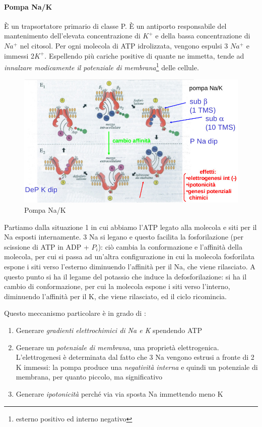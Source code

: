 \documentclass[a4paper,12pt]{article}
\begin{document}
\paragraph{Pompa Na/K}
È un trapsortatore primario di classe P. È un  antiporto responsabile del mantenimento dell'elevata concentrazione di $K^{+}$ e della bassa concentrazione di $Na^{+}$ nel citosol. Per ogni molecola di ATP idrolizzata, vengono espulsi 3 $Na^{+}$ e immessi 2$K^{+}$. Espellendo più cariche positive di quante ne immetta, tende ad \emph{innalzare modicamente il potenziale di membrana}\footnote{esterno positivo ed interno negativo} delle cellule.
\begin{figure}[H]
\centering
\includegraphics[scale=0.4]{immagine/NaK.jpg}
\caption{Pompa Na/K}
\end{figure}

Partiamo dalla situazione 1 in cui
abbiamo l’ATP legato alla molecola e siti per il
Na esposti internamente. 3
Na si legano e questo facilita la
fosforilazione (per scissione di ATP in ADP + $P_{i}$): ciò cambia la
conformazione e l’affinità della
molecola, per cui si passa ad
un’altra configurazione in cui la
molecola fosforilata espone i siti verso l’esterno diminuendo l’affinità
per il Na, che viene rilasciato.
A questo punto si ha il legame
del potassio che induce la defosforilazione: si ha il cambio di conformazione, per cui la molecola espone i siti verso l'interno, diminuendo l'affinità per il K, che viene rilasciato, ed il ciclo ricomincia.

Questo meccanismo particolare è in grado di :
\begin{enumerate}
\item{Generare \emph{gradienti elettrochimici di Na e K} spendendo ATP}
\item{Generare un \emph{potenziale di membrana}, una proprietà elettrogenica. L’elettrogenesi è determinata dal fatto  che 3 Na vengono estrusi a fronte di 2 K immessi: la pompa produce una \emph{negatività interna} e quindi un potenziale di membrana, per quanto piccolo, ma significativo}
\item{Generare \emph{ipotonicità} perché via via
sposta Na immettendo meno K}
\end{enumerate}
\end{document}
